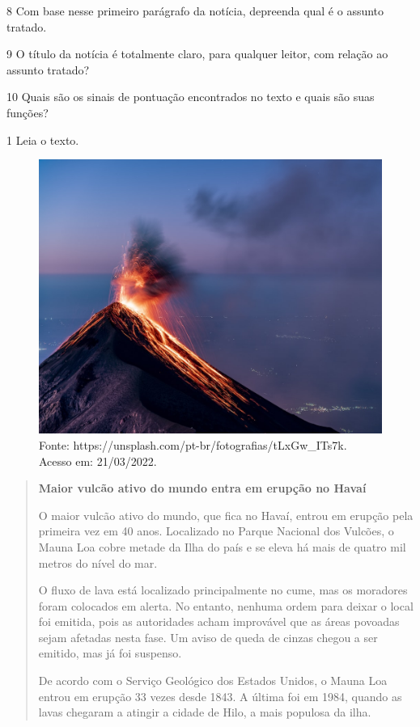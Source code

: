 \num{8} Com base nesse primeiro parágrafo da notícia, depreenda qual é o assunto tratado.



\num{9} O título da notícia é totalmente claro, para qualquer leitor, com relação ao assunto tratado?



\num{10} Quais são os sinais de pontuação encontrados no texto e quais são
suas funções?




\num{1} Leia o texto.

\begin{figure}[htpb!]
\includegraphics[width=.5\textwidth]{./imgs/img9.jpg}
\caption{Fonte: https://unsplash.com/pt-br/fotografias/tLxGw\_ITs7k. Acesso em: 21/03/2022.}
\end{figure}

\begin{quote}
\textbf{Maior vulcão ativo do mundo entra em erupção no Havaí}

O maior vulcão ativo do mundo, que fica no Havaí, entrou em erupção pela primeira vez em 40 anos. Localizado no Parque Nacional dos Vulcões, o Mauna Loa cobre metade da Ilha do país e se eleva há mais de quatro mil metros do nível do mar.

O fluxo de lava está localizado principalmente no cume, mas os moradores foram colocados em alerta. No entanto, nenhuma ordem para deixar o local foi emitida, pois as autoridades acham improvável que as áreas povoadas sejam afetadas nesta fase. Um aviso de queda de cinzas chegou a ser emitido, mas já foi suspenso.

De acordo com o Serviço Geológico dos Estados Unidos, o Mauna Loa entrou em erupção 33 vezes desde 1843. A última foi em 1984, quando as lavas chegaram a atingir a cidade de Hilo, a mais populosa da ilha.

\end{quote}

